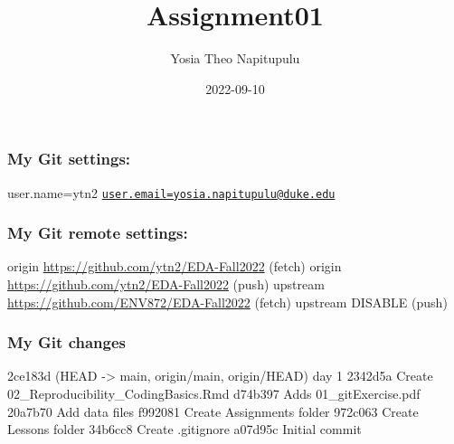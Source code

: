 \documentclass[
]{article}
\title{Assignment01}
\author{Yosia Theo Napitupulu}
\date{2022-09-10}
\begin{document}
\maketitle

\hypertarget{my-git-settings}{%
\subsubsection{My Git settings:}\label{my-git-settings}}

user.name=ytn2
\href{mailto:user.email=yosia.napitupulu@duke.edu}{\nolinkurl{user.email=yosia.napitupulu@duke.edu}}

\hypertarget{my-git-remote-settings}{%
\subsubsection{My Git remote settings:}\label{my-git-remote-settings}}

origin \url{https://github.com/ytn2/EDA-Fall2022} (fetch) origin
\url{https://github.com/ytn2/EDA-Fall2022} (push) upstream
\url{https://github.com/ENV872/EDA-Fall2022} (fetch) upstream DISABLE
(push)

\hypertarget{my-git-changes}{%
\subsubsection{My Git changes}\label{my-git-changes}}

2ce183d (HEAD -\textgreater{} main, origin/main, origin/HEAD) day 1
2342d5a Create 02\_Reproducibility\_CodingBasics.Rmd d74b397 Adds
01\_gitExercise.pdf 20a7b70 Add data files f992081 Create Assignments
folder 972c063 Create Lessons folder 34b6cc8 Create .gitignore a07d95c
Initial commit
\end{document}
